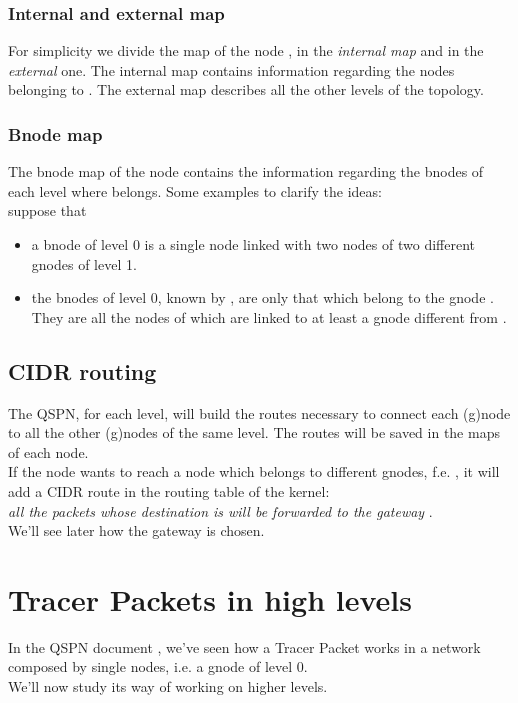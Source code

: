 \documentclass[a4paper]{article}
\begin{document}
\subsubsection{Internal and external map}
For simplicity we divide the map of the node , in the \emph{internal map} and in
the \emph{external} one.  The internal map contains information regarding the
nodes belonging to . The external map describes all the other levels of
the topology.

\subsubsection{Bnode map}
The bnode map of the node   contains the information regarding the bnodes
of each level where  belongs.
Some examples to clarify the ideas:\\

suppose that 
\begin{itemize}
	\item a bnode of level 0 is a single node linked with two nodes of two
		different gnodes of level 1.
	\item the bnodes of level 0, known by , are only that which belong
		to the gnode . They are all the nodes of  which are
		linked to at least a gnode different from .
\end{itemize}

\subsection{CIDR routing}
The QSPN, for each level, will build the routes necessary to connect each
(g)node to all the other (g)nodes of the same level. The routes will be saved
in the maps of each node.\\

If the node  wants to reach a node  which
belongs to different gnodes, f.e. , it will
add a CIDR\cite{CIDR} route in the routing table of the kernel:\\
\emph{all the packets whose destination is  will be forwarded to the gateway }.\\

We'll see later how the gateway  is chosen.

\section{Tracer Packets in high levels}
In the QSPN document \cite{qspndoc}, we've seen how a Tracer Packet works in a
network composed by single nodes, i.e. a gnode of level 0. \\
We'll now study its way of working on higher levels.
\end{document}
